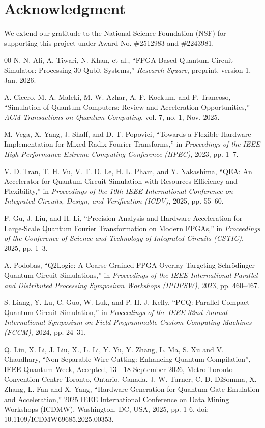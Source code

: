 \documentclass[conference]{IEEEtran}
\begin{document}
\section*{Acknowledgment}
We extend our gratitude to the National Science Foundation (NSF) for supporting this project under Award No. \#2512983 and \#2243981. 


\begin{thebibliography}{00}
N. N. Ali, A. Tiwari, N. Khan, et al.,
``FPGA Based Quantum Circuit Simulator: Processing 30 Qubit Systems,''
\textit{Research Square}, preprint, version 1, Jan. 2026.

A. Cicero, M. A. Maleki, M. W. Azhar, A. F. Kockum, and P. Trancoso,
``Simulation of Quantum Computers: Review and Acceleration Opportunities,''
\textit{ACM Transactions on Quantum Computing},
vol. 7, no. 1, Nov. 2025.

M. Vega, X. Yang, J. Shalf, and D. T. Popovici,
``Towards a Flexible Hardware Implementation for Mixed-Radix Fourier Transforms,''
in \textit{Proceedings of the IEEE High Performance Extreme Computing
Conference (HPEC)}, 2023, pp. 1--7.

V. D. Tran, T. H. Vu, V. T. D. Le, H. L. Pham, and Y. Nakashima,
``QEA: An Accelerator for Quantum Circuit Simulation with Resources
Efficiency and Flexibility,''
in \textit{Proceedings of the 10th IEEE International Conference on
Integrated Circuits, Design, and Verification (ICDV)},
2025, pp. 55--60.

F. Gu, J. Liu, and H. Li,
``Precision Analysis and Hardware Acceleration for Large-Scale
Quantum Fourier Transformation on Modern FPGAs,''
in \textit{Proceedings of the Conference of Science and Technology
of Integrated Circuits (CSTIC)}, 2025, pp. 1--3.

A. Podobas,
``Q2Logic: A Coarse-Grained FPGA Overlay Targeting
Schr{\"o}dinger Quantum Circuit Simulations,''
in \textit{Proceedings of the IEEE International Parallel and
Distributed Processing Symposium Workshops (IPDPSW)},
2023, pp. 460--467.

S. Liang, Y. Lu, C. Guo, W. Luk, and P. H. J. Kelly,
``PCQ: Parallel Compact Quantum Circuit Simulation,''
in \textit{Proceedings of the IEEE 32nd Annual International Symposium
on Field-Programmable Custom Computing Machines (FCCM)},
2024, pp. 24--31.

 Q. Liu, X. Li, J. Liu, X., L. Li, Y. Yu, Y. Zhang, L. Ma, S. Xu and V. Chaudhary, “Non-Separable Wire Cutting: Enhancing Quantum Compilation”, IEEE Quantum Week, Accepted, 13 - 18 September 2026, Metro Toronto Convention Centre Toronto, Ontario, Canada.
J. W. Turner, C. D. DiSomma, X. Zhang, L. Fan and X. Yang, ``Hardware Generation for Quantum Gate Emulation and Acceleration,'' 2025 IEEE International Conference on Data Mining Workshops (ICDMW), Washington, DC, USA, 2025, pp. 1-6, doi: 10.1109/ICDMW69685.2025.00353. 


\end{thebibliography}
\end{document}
